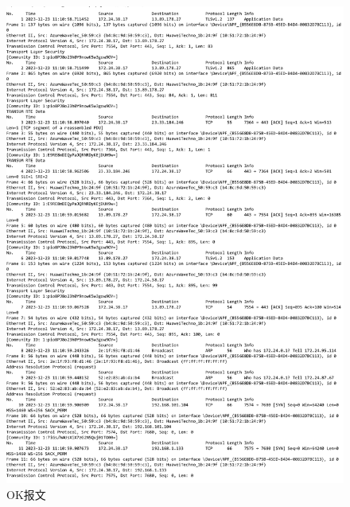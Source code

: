 \documentclass{article}
\begin{document}
\begin{figure}[htbp]
    \centering
    \includegraphics[width=1\textwidth]{lab0.3.pdf} %
    \caption{OK报文}
\end{figure}
\end{document}
